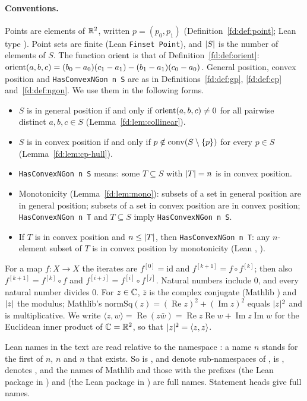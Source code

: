 \paragraph{Conventions.}
Points are elements of $\mathbb R^2$, written $p=(p_0,p_1)$ (Definition~\ref{fd:def:point}; Lean type ). Point
sets are finite (Lean \texttt{Finset Point}), and $\lvert S\rvert$ is the number of elements of $S$. The function $\operatorname{orient}$ is
that of Definition~\ref{fd:def:orient}: $\operatorname{orient}(a,b,c)=(b_0-a_0)(c_1-a_1)-(b_1-a_1)(c_0-a_0)$. General position,
convex position and \texttt{HasConvexNGon n S} are as in Definitions~\ref{fd:def:gp}, \ref{fd:def:cp}
and~\ref{fd:def:ngon}. We use them in the following forms.
\begin{itemize}
\item $S$ is in general position if and only if $\operatorname{orient}(a,b,c)\ne0$ for all pairwise distinct $a,b,c\in S$
  (Lemma~\ref{fd:lem:collinear}).
\item $S$ is in convex position if and only if $p\notin\operatorname{conv}(S\setminus\{p\})$ for every $p\in S$
  (Lemma~\ref{fd:lem:cp-hull}).
\item \texttt{HasConvexNGon n S} means: some $T\subseteq S$ with $\lvert T\rvert=n$ is in convex position.
\item Monotonicity (Lemma~\ref{fd:lem:mono}): subsets of a set in general position are in general position; subsets of
  a set in convex position are in convex position; \texttt{HasConvexNGon n T} and $T\subseteq S$ imply
  \texttt{HasConvexNGon n S}.
\item If $T$ is in convex position and $n\le\lvert T\rvert$, then \texttt{HasConvexNGon n T}: any $n$-element subset of $T$ is
  in convex position by monotonicity (Lean , ).
\end{itemize}
For a map $f\colon X\to X$ the iterates are $f^{[0]}=\mathrm{id}$ and $f^{[k+1]}=f\circ f^{[k]}$; then also
$f^{[k+1]}=f^{[k]}\circ f$ and $f^{[i+j]}=f^{[i]}\circ f^{[j]}$. Natural numbers include $0$, and every natural number
divides $0$. For $z\in\mathbb C$, $\bar z$ is the complex conjugate (Mathlib ) and $\lvert z\rvert$ the modulus;
Mathlib's $\mathrm{normSq}(z)=(\operatorname{Re}z)^2+(\operatorname{Im}z)^2$ equals $\lvert z\rvert^2$ and is multiplicative.
We write $\langle z,w\rangle=\operatorname{Re}(z\bar w)=\operatorname{Re}z\operatorname{Re}w+\operatorname{Im}z
\operatorname{Im}w$ for the Euclidean inner product of $\mathbb C=\mathbb R^2$, so that $\lvert z\rvert^2=\langle z,z\rangle$.

Lean names in the text are read relative to the namespace : a name $n$ stands for the
first of $n$, $n$ and $n$ that exists. So 
is ,  and  denote sub-namespaces of
,  is ,  denotes
, and the names of Mathlib and those with the prefixes  (the Lean package in
) and  (the Lean package in ) are full names. Statement heads give full names.

